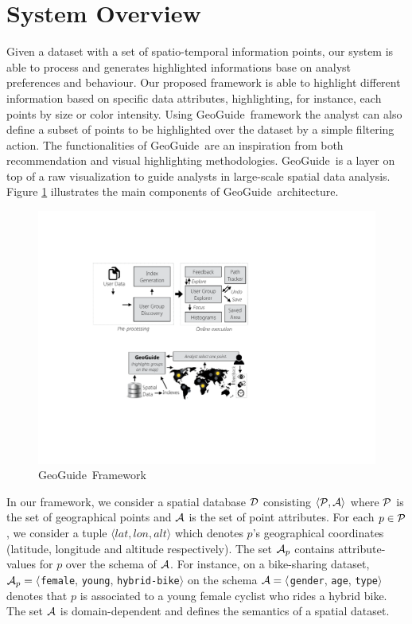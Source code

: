 \documentclass{vldb}
\newcommand{\framework}{{\sc GeoGuide}}
\begin{document}
\section{System Overview}
\label{sec:pb}

Given a dataset with a set of spatio-temporal information points, our system is able to process and generates highlighted informations base on analyst preferences and behaviour. Our proposed framework is able to highlight different information based on specific data attributes, highlighting, for instance, each points by size or color intensity. Using \framework\ framework the analyst can also define a subset of points to be highlighted over the dataset by a simple filtering action. The functionalities of \framework\ are an inspiration from both recommendation \cite{Omidvar-Tehrani:2015} and visual highlighting \cite{Liang2010,Robinson2011} methodologies. \framework\ is a layer on top of a raw visualization to guide analysts in large-scale spatial data analysis. Figure \ref{fig:framework} illustrates the main components of \framework\ architecture.


\begin{figure}[!ht]
  \centering
  \includegraphics[width=\columnwidth]{figs/framework}
\caption{\framework\ Framework}
\label{fig:framework}
\vspace{-10pt}
\end{figure}

In our framework, we consider a spatial database ${\cal D}$ consisting $\langle {\cal P}, {\cal A} \rangle$ where ${\cal P}$ is the set of
geographical points and ${\cal A}$ is the set of point attributes. For each $p \in {\cal P}$, we consider a tuple $\langle lat, lon, alt\rangle$ which denotes $p$'s geographical coordinates (latitude, longitude and altitude respectively). The set ${\cal A}_p$ contains attribute-values for $p$ over the schema of ${\cal A}$. For instance, on a bike-sharing dataset, ${\cal A}_p = \langle${\tt female}, {\tt young}, {\tt hybrid-bike}$\rangle$ on the schema ${\cal A} = \langle${\tt gender}, {\tt age}, {\tt type}$\rangle$ denotes that $p$ is associated to a young female cyclist who rides a hybrid bike. The set ${\cal A}$ is domain-dependent and defines the semantics of a spatial dataset.
\end{document}
